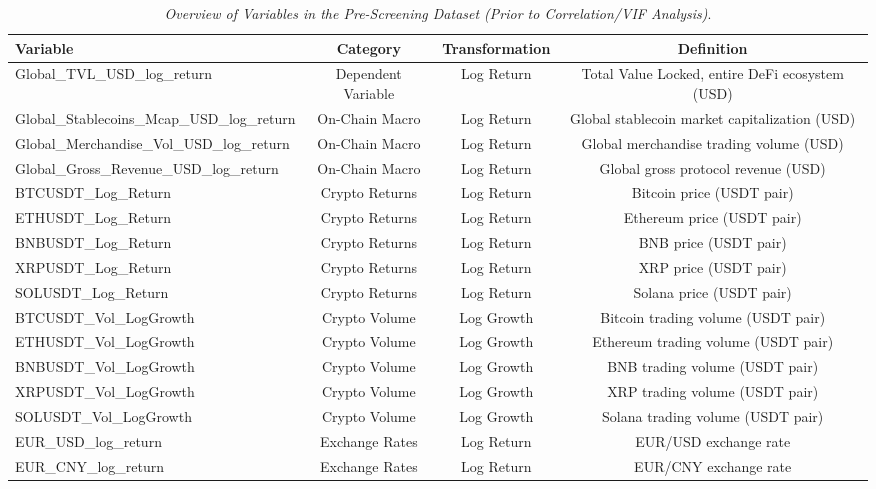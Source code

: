 \begin{table}[h]
  \centering
  \caption{\textit{Overview of Variables in the Pre-Screening Dataset (Prior to Correlation/VIF Analysis)}.}
  \label{tab:compdata}
  \begin{tabular}{lccc}
    \toprule
    \textbf{Variable} & \textbf{Category} & \textbf{Transformation} & \textbf{Definition} \\ 
    \midrule
    Global\_TVL\_USD\_log\_return & Dependent Variable & Log Return & Total Value Locked, entire DeFi ecosystem (USD) \\ 
    Global\_Stablecoins\_Mcap\_USD\_log\_return & On-Chain Macro & Log Return & Global stablecoin market capitalization (USD) \\ 
    Global\_Merchandise\_Vol\_USD\_log\_return & On-Chain Macro & Log Return & Global merchandise trading volume (USD) \\ 
    Global\_Gross\_Revenue\_USD\_log\_return & On-Chain Macro & Log Return & Global gross protocol revenue (USD) \\ 
    BTCUSDT\_Log\_Return & Crypto Returns & Log Return & Bitcoin price (USDT pair) \\ 
    ETHUSDT\_Log\_Return & Crypto Returns & Log Return & Ethereum price (USDT pair) \\ 
    BNBUSDT\_Log\_Return & Crypto Returns & Log Return & BNB price (USDT pair) \\ 
    XRPUSDT\_Log\_Return & Crypto Returns & Log Return & XRP price (USDT pair) \\ 
    SOLUSDT\_Log\_Return & Crypto Returns & Log Return & Solana price (USDT pair) \\ 
    BTCUSDT\_Vol\_LogGrowth & Crypto Volume & Log Growth & Bitcoin trading volume (USDT pair) \\ 
    ETHUSDT\_Vol\_LogGrowth & Crypto Volume & Log Growth & Ethereum trading volume (USDT pair) \\ 
    BNBUSDT\_Vol\_LogGrowth & Crypto Volume & Log Growth & BNB trading volume (USDT pair) \\ 
    XRPUSDT\_Vol\_LogGrowth & Crypto Volume & Log Growth & XRP trading volume (USDT pair) \\ 
    SOLUSDT\_Vol\_LogGrowth & Crypto Volume & Log Growth & Solana trading volume (USDT pair) \\ 
    EUR\_USD\_log\_return & Exchange Rates & Log Return & EUR/USD exchange rate \\ 
    EUR\_CNY\_log\_return & Exchange Rates & Log Return & EUR/CNY exchange rate \\ 

\end{tabular}
\end{table}
